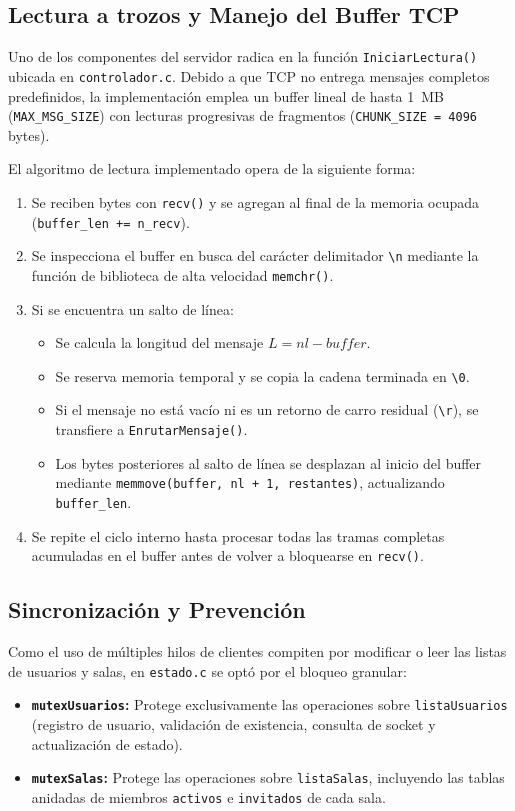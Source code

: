 \documentclass[12pt,a4paper]{article}
\begin{document}
\subsection{Lectura a trozos y Manejo del Buffer TCP}
Uno de los componentes del servidor radica en la función \texttt{IniciarLectura()} ubicada en \texttt{controlador.c}. Debido a que TCP no entrega mensajes completos predefinidos, la implementación emplea un buffer lineal de hasta 1~MB (\texttt{MAX\_MSG\_SIZE}) con lecturas progresivas de fragmentos (\texttt{CHUNK\_SIZE = 4096} bytes).

El algoritmo de lectura implementado opera de la siguiente forma:
\begin{enumerate}
    \item Se reciben bytes con \texttt{recv()} y se agregan al final de la memoria ocupada (\texttt{buffer\_len += n\_recv}).
    \item Se inspecciona el buffer en busca del carácter delimitador \texttt{\textbackslash n} mediante la función de biblioteca de alta velocidad \texttt{memchr()}.
    \item Si se encuentra un salto de línea:
    \begin{itemize}
        \item Se calcula la longitud del mensaje $L = nl - buffer$.
        \item Se reserva memoria temporal y se copia la cadena terminada en \texttt{\textbackslash 0}.
        \item Si el mensaje no está vacío ni es un retorno de carro residual (\texttt{\textbackslash r}), se transfiere a \texttt{EnrutarMensaje()}.
        \item Los bytes posteriores al salto de línea se desplazan al inicio del buffer mediante \texttt{memmove(buffer, nl + 1, restantes)}, actualizando \texttt{buffer\_len}.
    \end{itemize}
    \item Se repite el ciclo interno hasta procesar todas las tramas completas acumuladas en el buffer antes de volver a bloquearse en \texttt{recv()}.
\end{enumerate}

\subsection{Sincronización y Prevención}
Como el uso de múltiples hilos de clientes compiten por modificar o leer las listas de usuarios y salas, en \texttt{estado.c} se optó por el bloqueo granular:
\begin{itemize}
    \item \textbf{\texttt{mutexUsuarios}:} Protege exclusivamente las operaciones sobre \texttt{listaUsuarios} (registro de usuario, validación de existencia, consulta de socket y actualización de estado).
    \item \textbf{\texttt{mutexSalas}:} Protege las operaciones sobre \texttt{listaSalas}, incluyendo las tablas anidadas de miembros \texttt{activos} e \texttt{invitados} de cada sala.
\end{itemize}
\end{document}

